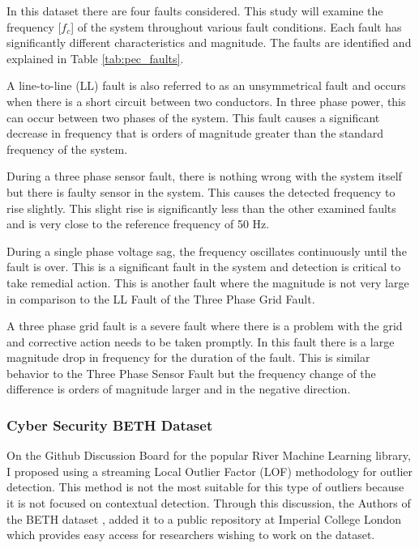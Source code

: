 In this dataset there are four faults considered. This study will examine the frequency [$f_c$] of the system throughout various fault conditions. Each fault has significantly different characteristics and magnitude. The faults are identified and explained in Table \ref{tab:pec_faults}.



%     

A line-to-line (LL) fault is also referred to as an unsymmetrical fault and occurs when there is a short circuit between two conductors. In three phase power, this can occur between two phases of the system. This fault causes a significant decrease in frequency that is orders of magnitude greater than the standard frequency of the system. 

During a three phase sensor fault, there is nothing wrong with the system itself but there is faulty sensor in the system. This causes the detected frequency to rise slightly. This slight rise is significantly less than the other examined faults and is very close to the reference frequency of 50 Hz. 

During a single phase voltage sag, the frequency oscillates continuously until the fault is over. This is a significant fault in the system and detection is critical to take remedial action. This is another fault where the magnitude is not very large in comparison to the LL Fault of the Three Phase Grid Fault.

A three phase grid fault is a severe fault where there is a problem with the grid and corrective action needs to be taken promptly. In this fault there is a large magnitude drop in frequency for the duration of the fault. This is similar behavior to the Three Phase Sensor Fault but the frequency change of the difference is orders of magnitude larger and in the negative direction.

\subsubsection{Cyber Security BETH Dataset}
\label{ref_beth_dataset}

On the Github Discussion Board \parencite{RiverGithub2022} for the popular River \parencite{2020river} Machine Learning library, I proposed using a streaming Local Outlier Factor (LOF) methodology for outlier detection. This method is not the most suitable for this type of outliers because it is not focused on contextual detection.  Through this discussion, the Authors of the BETH dataset \parencite{beth-dataset}, added it to a public repository at Imperial College London which provides easy access for researchers wishing to work on the dataset.

